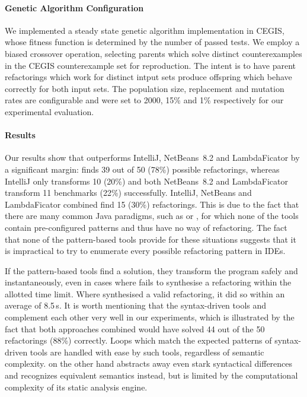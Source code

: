 \documentclass[runningheads,a4paper]{llncs}
\begin{document}
\paragraph{Genetic Algorithm Configuration}
%
We implemented a steady state genetic algorithm implementation in CEGIS, whose
fitness function is determined by the number of passed tests.
We employ a biased crossover operation, selecting parents which solve distinct
counterexamples in the CEGIS counterexample set for reproduction.  The intent is to have
parent refactorings which work for distinct intput sets produce offspring which behave correctly
for both input sets. The population size, replacement and mutation rates are configurable and
were set to 2000, 15\% and 1\% respectively for our experimental evaluation.

\paragraph{Results}\label{experiments-results}
%
Our results show that \tool outperforms IntelliJ, NetBeans~8.2 and LambdaFicator
by a significant margin: \tool finds 39 out of 50 (78\%) possible refactorings, whereas
IntelliJ only transforms 10 (20\%) and both NetBeans~8.2 and LambdaFicator transform 11 
benchmarks (22\%) successfully.
IntelliJ, NetBeans and LambdaFicator
combined find 15 (30\%) refactorings.  This is due to the fact
that there are many common Java paradigms, such as  or
, for which none of the tools contain pre-configured
patterns and thus have no way of refactoring.  The fact that none of the pattern-based tools provide for
these situations suggests that it is impractical to try to enumerate every possible
refactoring pattern in IDEs.

If the pattern-based tools find a solution, they transform the program safely and
instantaneously, even in cases where \tool fails to synthesise a refactoring
within the allotted time limit.  Where \tool synthesised a valid refactoring, it did
so within an average of 8.5\,s.  It is worth mentioning that the syntax-driven tools
and \tool complement each other very well in our experiments, which is illustrated by the
fact that both approaches combined would have solved 44 out of the 50 refactorings (88\%)
correctly.  Loops which match the expected patterns of syntax-driven tools are handled
with ease by such tools, regardless of semantic complexity.  \tool on the other hand abstracts away
even stark syntactical differences and recognizes equivalent semantics instead, but is
limited by the computational complexity of its static analysis engine.
\end{document}
